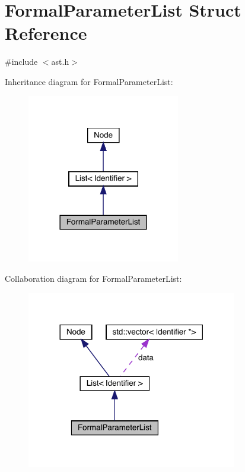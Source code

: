 \hypertarget{struct_formal_parameter_list}{}\section{Formal\+Parameter\+List Struct Reference}
\label{struct_formal_parameter_list}


{\ttfamily \#include $<$ast.\+h$>$}



Inheritance diagram for Formal\+Parameter\+List\+:\nopagebreak
\begin{figure}[H]
\begin{center}
\leavevmode
\includegraphics[width=189pt]{struct_formal_parameter_list__inherit__graph}
\end{center}
\end{figure}


Collaboration diagram for Formal\+Parameter\+List\+:\nopagebreak
\begin{figure}[H]
\begin{center}
\leavevmode
\includegraphics[width=260pt]{struct_formal_parameter_list__coll__graph}
\end{center}
\end{figure}
